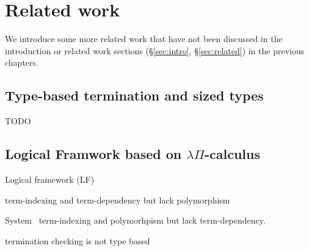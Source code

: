 \chapter{Related work}\label{ch:relwork}
We introduce some more related work that have not been discussed
in the introduction or related work sections (\S\ref{sec:intro},
\S\ref{sec:related}) in the previous chapters.



\section{Type-based termination and sized types}
TODO

\section{Logical Framwork based on $\lambda\Pi$-calculus}
Logical framework (LF)

term-indexing and term-dependency 
but lack polymorphism

System \Fi\
term-indexing and polymorhpism
but lack term-dependency.


termination checking is not type based


